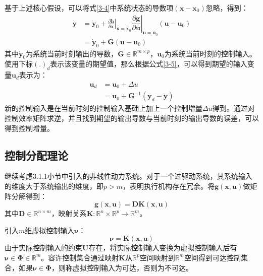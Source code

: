 基于上述核心假设，可以将式\eqref{3-4}中系统状态的导数项$(\boldsymbol{x}-\boldsymbol{x}_0)$忽略，得到：
\begin{equation}
    \begin{aligned}
    \dot{\boldsymbol{y}} &= \dot{\boldsymbol{y}}_0 +  \left.\frac{\partial \boldsymbol{h}}{\partial \boldsymbol{x}}\right|_{\boldsymbol{x}=\boldsymbol{x}_0}\left.\dfrac{\partial \boldsymbol{g}}{\partial \boldsymbol{u}}\right|_{\boldsymbol{u}=\boldsymbol{u}_0}(\boldsymbol{u}-\boldsymbol{u}_0)\\
        &= \dot{\boldsymbol{y}}_0 + \boldsymbol{G}(\boldsymbol{u}-\boldsymbol{u}_0)
    \end{aligned}
    \label{3-5}
\end{equation}
其中$\dot{\boldsymbol{y}}_0$为系统当前时刻输出的导数，$\boldsymbol{G}\in\mathbb{R}^{m\times p}$，$\boldsymbol{u}_0$为系统当前时刻的控制输入。
使用下标$(.)_{d}$表示该变量的期望值，那么根据公式\eqref{3-5}，可以得到期望的输入变量$\boldsymbol{u}_{d}$表示为：
\begin{equation}
    \begin{aligned}
    \boldsymbol{u}_{d}&=\boldsymbol{u}_{0}+\Delta u\\
    &=\boldsymbol{u}_{0}+\boldsymbol{G}^{-1}(\dot{\boldsymbol{y}_d}-\dot{\boldsymbol{y}})
    \label{3-6}
    \end{aligned}
\end{equation}
新的控制输入是在当前时刻的控制输入基础上加上一个控制增量$\Delta u$得到。通过对控制效率矩阵求逆，并且找到期望的输出导数与当前时刻的输出导数的误差，可以得到控制增量。

\subsection{控制分配理论}

继续考虑3.1.1小节中引入的非线性动力系统。对于一个过驱动系统，其系统输入的维度大于系统输出的维度，即$p>m$，表明执行机构存在冗余。将$\boldsymbol{g}(\boldsymbol{x},\boldsymbol{u})$做矩阵分解得到：
\begin{equation}
    \boldsymbol{g}(\boldsymbol{x},\boldsymbol{u})=\boldsymbol{D}\boldsymbol{K}(\boldsymbol{x},\boldsymbol{u})
    \label{3-7}
\end{equation}
其中$\boldsymbol{D}\in\mathbb{R}^{n\times m}$，映射关系$\boldsymbol{K}:\mathbb{R}^n\times\mathbb{R}^p\rightarrow\mathbb{R}^m$。

引入$m$维虚拟控制输入$\boldsymbol{\nu}$：
\begin{equation}
    \boldsymbol{\nu}=\boldsymbol{K}(\boldsymbol{x},\boldsymbol{u})
    \label{3-8}
\end{equation}
由于实际控制输入的约束$\boldsymbol{U}$存在，将实际控制输入变换为虚拟控制输入后有$\boldsymbol{\nu}\in\boldsymbol{\Phi}\in\mathbb{R}^{m}$。容许控制集合通过映射$\boldsymbol{K}$从$\mathbb{R}^{p}$空间映射到$\mathbb{R}^{m}$空间得到可达控制集合，如果$\boldsymbol{\nu}\in\boldsymbol{\Phi}$，则称虚拟控制输入为可达，否则为不可达。

